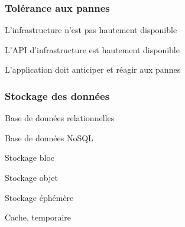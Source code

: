   \begin{frame}
    \frametitle{Tolérance aux pannes}
    \begin{frame}
      \item L'infrastructure n'est pas hautement disponible
      \item L'API d'infrastructure est hautement disponible
      \item L'application doit anticiper et réagir aux pannes
    \end{frame}
  \end{frame}

  \begin{frame}
    \frametitle{Stockage des données}
    \begin{frame}
      \item Base de données relationnelles
      \item Base de données NoSQL
      \item Stockage bloc
      \item Stockage objet
      \item Stockage éphémère
      \item Cache, temporaire
    \end{frame}
  \end{frame}

